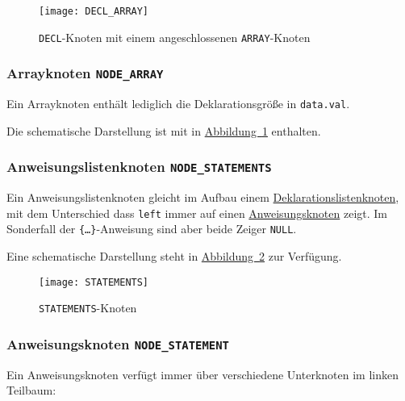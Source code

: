 \begin{figure}[h!]
\label{fig:declnode}
\centering
\texttt{[image: DECL\_ARRAY]}
\caption{\texttt{DECL}-Knoten mit einem angeschlossenen \texttt{ARRAY}-Knoten}
\end{figure}

\subsubsection{Arrayknoten \texttt{NODE\_ARRAY}}
\label{sec:arraynode}
Ein Arrayknoten enthält lediglich die Deklarationsgröße in \texttt{data.val}.

Die schematische Darstellung ist mit in \hyperref[fig:declnode]{Abbildung~\ref{fig:declnode}} enthalten.

\subsubsection{Anweisungslistenknoten \texttt{NODE\_STATEMENTS}}
\label{sec:stmtsnode}
Ein Anweisungslistenknoten gleicht im Aufbau einem \hyperref[sec:declsnode]{Deklarationslistenknoten},
mit dem Unterschied dass \texttt{left} immer auf einen \hyperref[sec:stmtnode]{Anweisungsknoten} zeigt.
Im Sonderfall der \texttt{\{\ldots\}}-Anweisung sind aber beide Zeiger \texttt{NULL}.

Eine schematische Darstellung steht in \hyperref[fig:stmtsnode]{Abbildung~\ref{fig:stmtsnode}} zur Verfügung.

\begin{figure}[h!]
\label{fig:stmtsnode}
\centering
\texttt{[image: STATEMENTS]}
\caption{\texttt{STATEMENTS}-Knoten}
\end{figure}

\subsubsection{Anweisungsknoten \texttt{NODE\_STATEMENT}}
\label{sec:stmt}
Ein Anweisungsknoten verfügt immer über verschiedene Unterknoten im linken Teilbaum:

